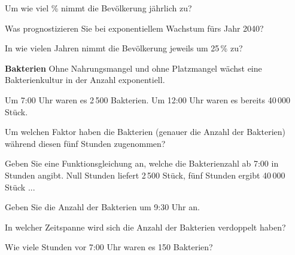 \begin{bbwAufgabenBlock}
\item Um wie viel \% nimmt die Bevölkerung jährlich zu?
\item Was prognostizieren Sie bei exponentiellem Wachstum fürs Jahr 2040?
\item In wie vielen Jahren nimmt die Bevölkerung jeweils um 25\,\% zu?
\end{bbwAufgabenBlock}
\platzFuerBerechnungenBisEndeSeite{}





\bbwActAufgabenNr{} \textbf{Bakterien}
 Ohne Nahrungsmangel und ohne Platzmangel wächst eine Bakterienkultur
 in der Anzahl exponentiell.

Um 7:00 Uhr waren es 2\,500 Bakterien.
Um 12:00 Uhr waren es bereits 40\,000 Stück.

\begin{bbwAufgabenBlock}

\item Um welchen Faktor haben die Bakterien (genauer die Anzahl der Bakterien) während diesen fünf
Stunden zugenommen?


\item Geben Sie eine Funktionsgleichung an, welche die Bakterienzahl ab
7:00 in Stunden angibt. Null Stunden liefert 2\,500 Stück, fünf
      Stunden ergibt 40\,000 Stück ...

\item Geben Sie die Anzahl der Bakterien um 9:30 Uhr an.

\item In welcher Zeitspanne wird sich die Anzahl der Bakterien
verdoppelt haben?

\item Wie viele Stunden vor 7:00 Uhr waren es 150 Bakterien?


\end{bbwAufgabenBlock}
\platzFuerBerechnungenBisEndeSeite{}

